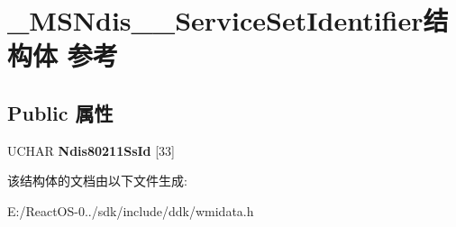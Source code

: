 \hypertarget{struct___m_s_ndis__80211___service_set_identifier}{}\section{\+\_\+\+M\+S\+Ndis\+\_\+\_\+\+Service\+Set\+Identifier结构体 参考}
\label{struct___m_s_ndis__80211___service_set_identifier}
\subsection*{Public 属性}
\begin{DoxyCompactItemize}
\item 
\mbox{\label{struct___m_s_ndis__80211___service_set_identifier_ae6f3651589f430a7ca8b07a48aba60a9}} 
U\+C\+H\+AR {\bfseries Ndis80211\+Ss\+Id} \mbox{[}33\mbox{]}
\end{DoxyCompactItemize}


该结构体的文档由以下文件生成\+:\begin{DoxyCompactItemize}
\item 
E\+:/\+React\+O\+S-\/0../sdk/include/ddk/wmidata.\+h\end{DoxyCompactItemize}
